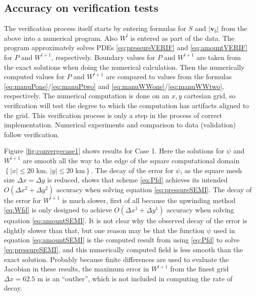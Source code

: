 \documentclass[11pt]{amsart}
\newcommand{\bv}{\mathbf{v}}
\begin{document}
\subsection*{Accuracy on verification tests}  The verification process itself starts by entering formulas for $S$ and $|\bv_b|$ from the above into a numerical program.  Also $W^l$ is entered as part of the data.  The program approximately solves PDEs \eqref{eq:pressureVERIF} and \eqref{eq:amountVERIF} for $P$ and $W^{l+1}$, respectively.  Boundary values for $P$ and $W^{l+1}$ are taken from the exact solutions when doing the numerical calculation.  Then the numerically computed values for $P$ and $W^{l+1}$ are compared to values from the formulas \eqref{eq:manuPone}/\eqref{eq:manuPtwo} and \eqref{eq:manuWWone}/\eqref{eq:manuWWtwo}, respectively.  The numerical computation is done on an $x,y$ cartesian grid, so verification will test the degree to which the computation has artifacts aligned to the grid.  This verification process is only a step in the process of correct implementation.  Numerical experiments and comparison to data (validation) follow verification.

Figure \ref{fig:convergecase1} shows results for Case 1.  Here the solutions for $\psi$ and $W^{l+1}$ are smooth all the way to the edge of the square computational domain $\left\{|x| \le 20 \text{ km}, \, |y| \le 20 \text{ km}\right\}$.  The decay of the error for $\psi$, as the square mesh size $\Delta x = \Delta y$ is reduced, shows that scheme \eqref{eq:Pfd} achieves its intended $O(\Delta x^2 + \Delta y^2)$ accuracy when solving equation \eqref{eq:pressureSEMI}.  The decay of the error for $W^{l+1}$ is much slower, first of all because the upwinding method \eqref{eq:Wfd} is only designed to achieve $O(\Delta x^1 + \Delta y^1)$ accuracy when solving equation \eqref{eq:amountSEMI}.  It is not clear why the observed decay of the error is slightly slower than that, but one reason may be that the function $\psi$ used in equation \eqref{eq:amountSEMI} is the computed result from using \eqref{eq:Pfd} to solve \eqref{eq:pressureSEMI}, and this numerically computed field is less smooth than the exact solution.  Probably because finite differences are used to evaluate the Jacobian in these results, the maximum error in $W^{l+1}$ from the finest grid $\Delta x = 62.5$ m is an ``outlier'', which is not included in computing the rate of decay.
\end{document}
